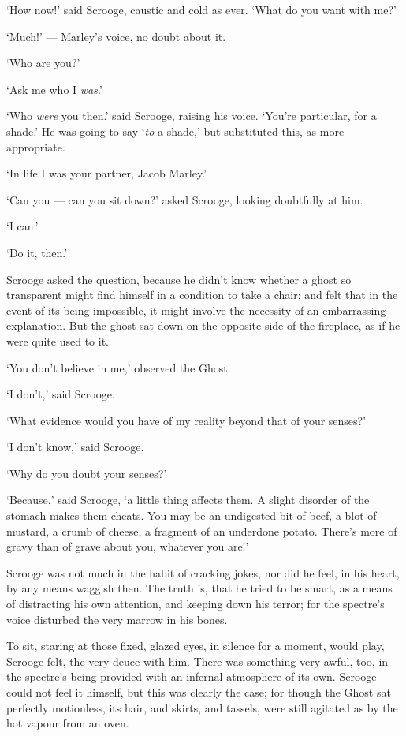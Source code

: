 \documentclass[11pt,twoside]{article}\makeatletter
\begin{document}
‘How now!’ said Scrooge, caustic and cold as ever.  ‘What do you want with me?’\par
‘Much!’ — Marley's voice, no doubt about it.  \par
‘Who are you?’\par
‘Ask me who I \textit{was}.’\par
‘Who \textit{were} you then.’ said Scrooge, raising his voice.  ‘You're particular, for a shade.’ He was going to say ‘\textit{to} a shade,’ but substituted this, as more appropriate.  \par
‘In life I was your partner, Jacob Marley.’\par
‘Can you — can you sit down?’ asked Scrooge, looking doubtfully at him. \par
‘I can.’\par
‘Do it, then.’\par
Scrooge asked the question, because he didn't know whether a ghost so transparent might find himself in a condition to take a chair; and felt that in the event of its being impossible, it might involve the necessity of an embarrassing explanation. But the ghost sat down on the opposite side of the fireplace, as if he were quite used to it.  \par
‘You don't believe in me,’ observed the Ghost.  \par
‘I don't,’ said Scrooge.  \par
‘What evidence would you have of my reality beyond that of your senses?’\par
‘I don't know,’ said Scrooge.  \par
‘Why do you doubt your senses?’\par
‘Because,’ said Scrooge, ‘a little thing affects them.  A slight disorder of the stomach makes them cheats.  You may be an undigested bit of beef, a blot of mustard, a crumb of cheese, a fragment of an underdone potato.  There's more of gravy than of grave about you, whatever you are!’\par
Scrooge was not much in the habit of cracking jokes, nor did he feel, in his heart, by any means waggish then.  The truth is, that he tried to be smart, as a means of distracting his own attention, and keeping down his terror; for the spectre's voice disturbed the very marrow in his bones.  \par
To sit, staring at those fixed, glazed eyes, in silence for a moment, would play, Scrooge felt, the very deuce with him. There was something very awful, too, in the spectre's being provided with an infernal atmosphere of its own.  Scrooge could not feel it himself, but this was clearly the case; for though the Ghost sat perfectly motionless, its hair, and skirts, and tassels, were still agitated as by the hot vapour from an oven.  \par
\end{document}
